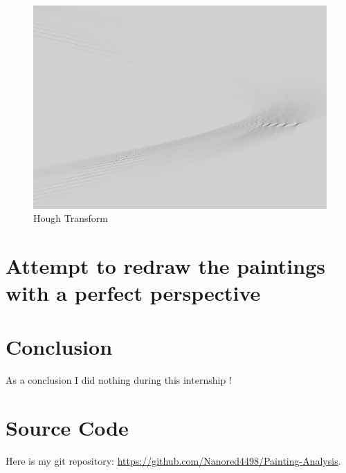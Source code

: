 \documentclass{article}
\begin{document}
	\begin{figure}[h]
		\centering
		\includegraphics[scale=1.2]{hough_painting.png}
		\caption{Hough Transform}
	\end{figure}

	\section{Attempt to redraw the paintings with a perfect perspective}

	\section{Conclusion}
	
	As a conclusion I did nothing during this internship !
	
	\appendix
	
	\section{Source Code}
	
	Here is my git repository: \url{https://github.com/Nanored4498/Painting-Analysis}.

	
	
	
\end{document}
